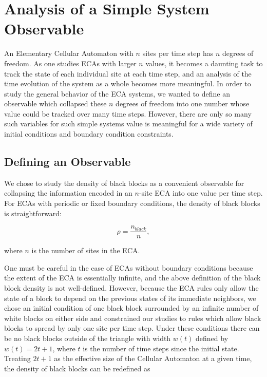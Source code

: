 \section{Analysis of a Simple System Observable}

An Elementary Cellular Automaton with $n$ sites per time step has
$n$ degrees of freedom.
As one studies ECAs with larger $n$ values, it becomes a daunting
task to track the state of each individual site at each time step, and
an analysis of the time evolution of the system as a whole becomes
more meaningful.
In order to study the general behavior of the ECA systems, we wanted
to define an observable which collapsed these $n$ degrees of freedom
into one number whose value could be tracked over many time steps.
However, there are only so many such variables for such simple
systems value is meaningful for a wide variety of initial conditions
and boundary condition constraints.


\subsection{Defining an Observable}

We chose to study the density of black blocks as a convenient
observable for collapsing the information encoded in an $n$-site ECA
into one value per time step.
For ECAs with periodic or fixed boundary conditions, the density of
black blocks is straightforward:

\begin{equation}
    \rho = \frac{n_{black}}{n},
\end{equation}

\noindent where $n$ is the number of sites in the ECA.

One must be careful in the case of ECAs without boundary conditions
because the extent of the ECA is essentially infinite, and the above
definition of the black block density is not well-defined.
However, because the ECA rules only allow the state of a block to
depend on the previous states of its immediate neighbors, we chose
an initial condition of one black block surrounded by an infinite
number of white blocks on either side and constrained our studies to
rules which allow black blocks to spread by only one site per time
step.
Under these conditions there can be no black blocks outside of the
triangle with width $w(t)$ defined by $w(t) = 2t+1$, where $t$ is the
number of time steps since the initial state.
Treating $2t+1$ as the effective size of the Cellular Automaton at a
given time, the density of black blocks can be redefined as

